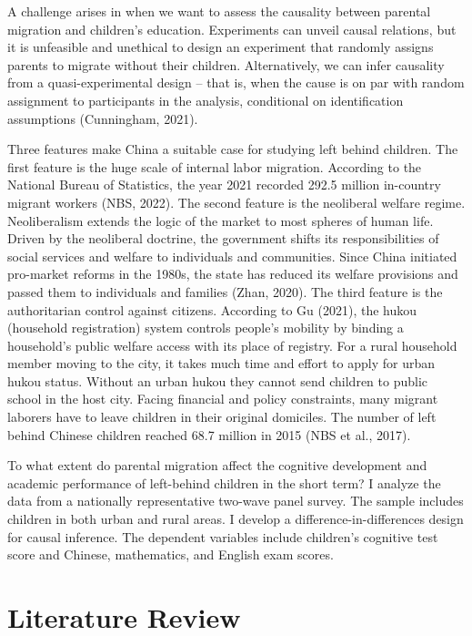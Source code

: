 \documentclass[
  man,floatsintext]{apa7}
\begin{document}
A challenge arises in when we want to assess the causality between parental migration and children's education. Experiments can unveil causal relations, but it is unfeasible and unethical to design an experiment that randomly assigns parents to migrate without their children. Alternatively, we can infer causality from a quasi-experimental design -- that is, when the cause is on par with random assignment to participants in the analysis, conditional on identification assumptions (Cunningham, 2021).

Three features make China a suitable case for studying left behind children. The first feature is the huge scale of internal labor migration. According to the National Bureau of Statistics, the year 2021 recorded 292.5 million in-country migrant workers (NBS, 2022). The second feature is the neoliberal welfare regime. Neoliberalism extends the logic of the market to most spheres of human life. Driven by the neoliberal doctrine, the government shifts its responsibilities of social services and welfare to individuals and communities. Since China initiated pro-market reforms in the 1980s, the state has reduced its welfare provisions and passed them to individuals and families (Zhan, 2020). The third feature is the authoritarian control against citizens. According to Gu (2021), the hukou (household registration) system controls people's mobility by binding a household's public welfare access with its place of registry. For a rural household member moving to the city, it takes much time and effort to apply for urban hukou status. Without an urban hukou they cannot send children to public school in the host city. Facing financial and policy constraints, many migrant laborers have to leave children in their original domiciles. The number of left behind Chinese children reached 68.7 million in 2015 (NBS et al., 2017).

To what extent do parental migration affect the cognitive development and academic performance of left-behind children in the short term? I analyze the data from a nationally representative two-wave panel survey. The sample includes children in both urban and rural areas. I develop a difference-in-differences design for causal inference. The dependent variables include children's cognitive test score and Chinese, mathematics, and English exam scores.

\newpage

\hypertarget{literature-review}{%
\section{Literature Review}\label{literature-review}}
\end{document}
